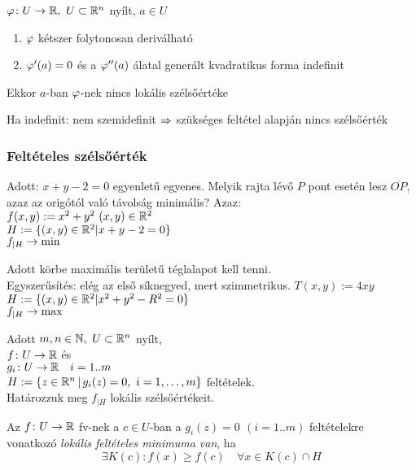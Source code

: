 \begin{te}
  $\varphi\colon U\to\mathbb{R},\ U\subset \mathbb{R}^n$ nyílt, $a\in U$
{\listazjromai
\begin{enumerate}
\item $\varphi$ kétszer folytonosan deriválható
\item $\varphi'(a)=0$ és a $\varphi''(a)$ álatal generált kvadratikus forma indefinit
\end{enumerate}
}
Ekkor $a$-ban $\varphi$-nek nincs lokális szélsőértéke
\end{te}
\begin{biz}
  Ha indefinit: nem szemidefinit $\Rightarrow$ szükséges feltétel alapján nincs szélsőérték
\end{biz}

\subsubsection{Feltételes szélsőérték}
\begin{PlSS}
  Adott: $x+y-2=0$ egyenletű egyenes. Melyik rajta lévő $P$ pont esetén lesz $\overline{OP}$, azaz az origótól való
  távolság minimális? Azaz:\\
  $f(x,y) := x^2 + y^2\ (x,y)\in\R^2$\\
  $H:=\{(x,y)\in\mathbb{R}^2| x+y-2=0\}$\\
  $f_{|H}\to\min$
\end{PlSS}
\begin{PlSS}\label{plss:fsz2}
  Adott körbe maximális területű téglalapot kell tenni.\\
  Egyszerűsítés: elég az első síknegyed, mert szimmetrikus.
  $T(x,y) := 4xy$\\
  $H:=\{(x,y)\in\mathbb{R}^2| x^2 + y^2 - R^2 =0\}$\\
  $f_{|H}\to\max$
\end{PlSS}
Adott $m,n\in\mathbb{N},\ U\subset\mathbb{R}^n$ nyílt,\\
$f\colon U\to\mathbb{R}$ és\\
$g_i\colon U\to\mathbb{R}\quad i=1..m$\\
$H:=\{ z\in\R^n\,|\,g_i(z)=0,\ i=1,\dotsc,m\}$ feltételek.\\
Határozzuk meg $f_{|H}$ lokális szélsőértékeit.

\begin{de}
  Az $f\colon U\to\mathbb{R}$ fv-nek  a $c\in U$-ban a $g_i(z)=0\ \,(i=1..m)$ feltételekre vonatkozó \emph{lokális feltételes
    minimuma van}, ha
  \[\exists K(c): f(x) \geq f(c)\quad \forall x\in K(c)\cap H\]
\end{de}

